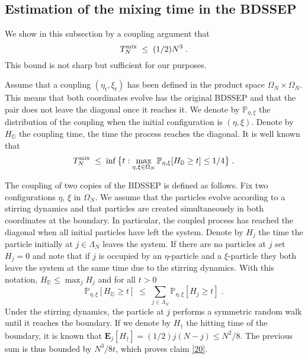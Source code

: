 \documentclass[reqno]{amsart}
\begin{document}
\subsection*{Estimation of the mixing time in the BDSSEP}

We show in this subsection by a coupling argument that
\begin{equation}
\label{20}
T^{\rm mix}_N \;\le\; (1/2) N^3\;.
\end{equation}
This bound is not sharp but sufficient for our purposes.

Assume that a coupling $(\eta_t, \xi_t)$ has been defined in the
product space $\Omega_N \times \Omega_N$. This means that both
coordinates evolve has the original BDSSEP and that the pair does not
leave the diagonal once it reaches it. We denote by ${{\mathbb P}}_{\eta,\xi}$
the distribution of the coupling when the initial configuration is
$(\eta,\xi)$. Denote by $H_{{{\mathbb D}}}$ the coupling time, the time the
process reaches the diagonal. It is well known that
\begin{equation*}
T^{\rm mix}_N \;\le\; \inf\big\{ t : \max_{\eta,\xi\in\Omega_N} 
{{\mathbb P}}_{\eta,\xi} [H_{{{\mathbb D}}} \ge t ] \le 1/4 \big\}\;.
\end{equation*}

The coupling of two copies of the BDSSEP is defined as follows.  Fix
two configurations $\eta$, $\xi$ in $\Omega_N$.  We assume that the
particles evolve according to a stirring dynamics and that particles
are created simultaneously in both coordinates at the boundary. In
particular, the coupled process has reached the diagonal when all
initial particles have left the system. Denote by $H_j$ the time the
particle initially at $j\in \Lambda_N$ leaves the system. If there are
no particles at $j$ set $H_j = 0$ and note that if $j$ is occupied by
an $\eta$-particle and a $\xi$-particle they both leave the system at
the same time due to the stirring dynamics. With this notation,
$H_{{{\mathbb D}}} \le \max_j H_j$ and for all $t>0$
\begin{equation*}
{{\mathbb P}}_{\eta,\xi} [H_{{{\mathbb D}}} \ge t ] \;\le\; \sum_{j\in\Lambda_N}
{{\mathbb P}}_{\eta,\xi} [H_{j} \ge t ]\;.
\end{equation*}
Under the stirring dynamics, the particle at $j$ performs a symmetric
random walk until it reaches the boundary. If we denote by
$H_{\dagger}$ the hitting time of the boundary, it is known that ${{\mathbf E}}_j[H_{\dagger}] = (1/2) j(N-j) \le N^2/8$. The previous sum is thus
bounded by $N^3/8t$, which proves claim \eqref{20}.
\end{document}
